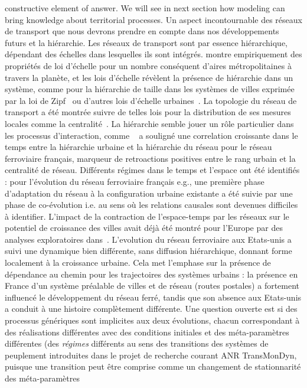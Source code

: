 {constructive element of answer. We will see in next section how modeling can bring knowledge about territorial processes.
}{
Un aspect incontournable des réseaux de transport que nous devrons prendre en compte dans nos développements futurs et la hiérarchie. Les réseaux de transport sont par essence hiérarchique, dépendant des échelles dans lesquelles ils sont intégrés. \cite{10.1371/journal.pone.0102007} montre empiriquement des propriétés de loi d'échelle pour un nombre conséquent d'aires métropolitaines à travers la planète, et les lois d'échelle révèlent la présence de hiérarchie dans un système, comme pour la hiérarchie de taille dans les systèmes de villes exprimée par la loi de Zipf~\cite{nitsch2005zipf} ou d'autres lois d'échelle urbaines~\cite{2013arXiv1301.1674A,2015arXiv151000902B}. La topologie du réseau de transport a été montrée suivre de telles lois pour la distribution de ses mesures locales comme la centralité~\cite{samaniego2008cities}. 
 La hiérarchie semble jouer un rôle particulier dans les processus d'interaction, comme ~\cite{bretagnolle:tel-00459720} a souligné une correlation croissante dans le temps entre la hiérarchie urbaine et la hiérarchie du réseau pour le réseau ferroviaire français, 
  marqueur de retroactions positives entre le rang urbain et la centralité de réseau. Différents régimes dans le temps et l'espace ont été identifiés : pour l'évolution du réseau ferroviaire français e.g., une première phase d'adaptation du réseau à la configuration urbaine existante a été suivie par une phase de co-évolution i.e. au sens où les relations causales sont devenues difficiles à identifier. L'impact de la contraction de l'espace-temps par les réseaux sur le potentiel de croissance des villes avait déjà été montré pour l'Europe par des analyses exploratoires dans~\cite{bretagnolle1998space}. L'evolution du réseau ferroviaire aux Etats-unis a suivi une dynamique bien différente, sans diffusion hiérarchique, donnant forme localement à la croissance urbaine. 
   Cela met l'emphase sur la présence de dépendance au chemin 
   pour les trajectoires des systèmes urbains : la présence en France d'un système préalable de villes et de réseau (routes postales) a fortement influencé le développement du réseau ferré, tandis que son absence aux Etats-unis a conduit à une histoire complètement différente. Une question ouverte est si des processus génériques sont implicites aux deux évolutions, chacun correspondant à des réalisations différentes avec des conditions initiales et des méta-paramètres différentes (des \emph{régimes} différents au sens des transitions des systèmes de peuplement introduites dans le projet de recherche courant ANR TransMonDyn, puisque une transition peut être comprise comme un changement de stationnarité des méta-paramètres 
}
